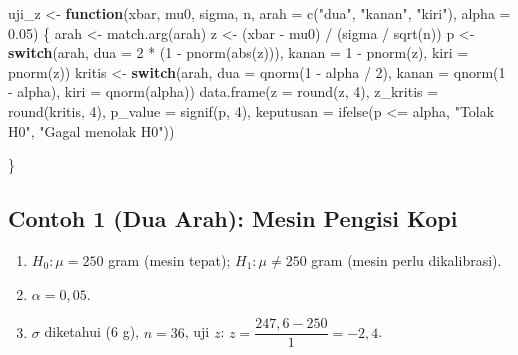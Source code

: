 \documentclass[
  indonesian,
  letterpaper,
]{book}
\newenvironment{Shaded}{\begin{snugshade}}{\end{snugshade}}
\newcommand{\AttributeTok}[1]{\textcolor[rgb]{0.40,0.45,0.13}{#1}}
\newcommand{\ControlFlowTok}[1]{\textcolor[rgb]{0.00,0.23,0.31}{\textbf{#1}}}
\newcommand{\DecValTok}[1]{\textcolor[rgb]{0.68,0.00,0.00}{#1}}
\newcommand{\FloatTok}[1]{\textcolor[rgb]{0.68,0.00,0.00}{#1}}
\newcommand{\FunctionTok}[1]{\textcolor[rgb]{0.28,0.35,0.67}{#1}}
\newcommand{\NormalTok}[1]{\textcolor[rgb]{0.00,0.23,0.31}{#1}}
\newcommand{\OtherTok}[1]{\textcolor[rgb]{0.00,0.23,0.31}{#1}}
\newcommand{\SpecialCharTok}[1]{\textcolor[rgb]{0.37,0.37,0.37}{#1}}
\newcommand{\StringTok}[1]{\textcolor[rgb]{0.13,0.47,0.30}{#1}}
\begin{document}
\begin{Shaded}
\begin{Highlighting}[]
\NormalTok{uji\_z }\OtherTok{\textless{}{-}} \ControlFlowTok{function}\NormalTok{(xbar, mu0, sigma, n, }\AttributeTok{arah =} \FunctionTok{c}\NormalTok{(}\StringTok{"dua"}\NormalTok{, }\StringTok{"kanan"}\NormalTok{, }\StringTok{"kiri"}\NormalTok{), }\AttributeTok{alpha =}
\FloatTok{0.05}\NormalTok{) \{}
\NormalTok{arah }\OtherTok{\textless{}{-}} \FunctionTok{match.arg}\NormalTok{(arah)}
\NormalTok{z }\OtherTok{\textless{}{-}}\NormalTok{ (xbar }\SpecialCharTok{{-}}\NormalTok{ mu0) }\SpecialCharTok{/}\NormalTok{ (sigma }\SpecialCharTok{/} \FunctionTok{sqrt}\NormalTok{(n))}
\NormalTok{p }\OtherTok{\textless{}{-}} \ControlFlowTok{switch}\NormalTok{(arah, }\AttributeTok{dua =} \DecValTok{2} \SpecialCharTok{*}\NormalTok{ (}\DecValTok{1} \SpecialCharTok{{-}} \FunctionTok{pnorm}\NormalTok{(}\FunctionTok{abs}\NormalTok{(z))), }\AttributeTok{kanan =} \DecValTok{1} \SpecialCharTok{{-}} \FunctionTok{pnorm}\NormalTok{(z), }\AttributeTok{kiri =}
\FunctionTok{pnorm}\NormalTok{(z))}
\NormalTok{kritis }\OtherTok{\textless{}{-}} \ControlFlowTok{switch}\NormalTok{(arah, }\AttributeTok{dua =} \FunctionTok{qnorm}\NormalTok{(}\DecValTok{1} \SpecialCharTok{{-}}\NormalTok{ alpha }\SpecialCharTok{/} \DecValTok{2}\NormalTok{), }\AttributeTok{kanan =} \FunctionTok{qnorm}\NormalTok{(}\DecValTok{1} \SpecialCharTok{{-}}\NormalTok{ alpha),}
\AttributeTok{kiri =} \FunctionTok{qnorm}\NormalTok{(alpha))}
\FunctionTok{data.frame}\NormalTok{(}\AttributeTok{z =} \FunctionTok{round}\NormalTok{(z, }\DecValTok{4}\NormalTok{), }\AttributeTok{z\_kritis =} \FunctionTok{round}\NormalTok{(kritis, }\DecValTok{4}\NormalTok{), }\AttributeTok{p\_value =} \FunctionTok{signif}\NormalTok{(p, }\DecValTok{4}\NormalTok{),}
\AttributeTok{keputusan =} \FunctionTok{ifelse}\NormalTok{(p }\SpecialCharTok{\textless{}=}\NormalTok{ alpha, }\StringTok{"Tolak H0"}\NormalTok{, }\StringTok{"Gagal menolak H0"}\NormalTok{))}

\NormalTok{\}}
\end{Highlighting}
\end{Shaded}

\subsection{Contoh 1 (Dua Arah): Mesin Pengisi
Kopi}\label{contoh-1-dua-arah-mesin-pengisi-kopi}

\begin{enumerate}
\def\labelenumi{\arabic{enumi}.}
\item
  \(H_0: \mu = 250\) gram (mesin tepat); \(H_1: \mu \ne 250\) gram
  (mesin perlu dikalibrasi).
\item
  \(\alpha = 0{,}05\).
\item
  \(\sigma\) diketahui (6 g), \(n = 36\), uji \(z\):
  \(z = \dfrac{247{,}6 - 250}{1} = -2{,}4\).
\end{enumerate}
\end{document}
